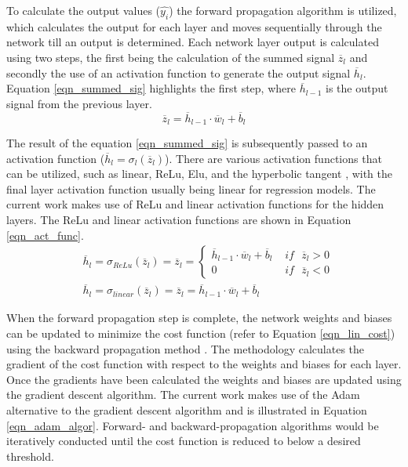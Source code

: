 \documentclass[a4paper,fleqn]{cas-dc}
\begin{document}
To calculate the output values ($\hat{y_i}$) the forward propagation algorithm is utilized, which calculates the output for each layer and moves sequentially through the network till an output is determined. Each network layer output is calculated using two steps, the first being the calculation of the summed signal $\overline{z}_l$ and secondly the use of an activation function to generate the output signal $\overline{h}_l$. Equation \ref{eqn_summed_sig} highlights the first step, where $\overline{h}_{l-1}$ is the output signal from the previous layer.
\begin{equation}\label{eqn_summed_sig}
\overline{z}_l = \overline{h}_{l-1}\cdot\overline{w}_l+\overline{b}_l
\end{equation}

The result of the equation \ref{eqn_summed_sig} is subsequently passed to an activation function ($\overline{h}_l = \sigma_l(\overline{z}_l)$). There are various activation functions that can be utilized, such as linear, ReLu, Elu, and the hyperbolic tangent \citep{goodfellow}, with the final layer activation function usually being linear for regression models. The current work makes use of ReLu and linear activation functions for the hidden layers. The ReLu and linear activation functions are shown in Equation \ref{eqn_act_func}.
\begin{equation}\label{eqn_act_func}
\begin{split}
&\overline{h}_l=\sigma_{ReLu}(\overline{z}_l) = \overline{z}_l =  
	\begin{cases}
	 \overline{h}_{l-1}\cdot\overline{w}_l+\overline{b}_l\,\, &if\,\,\,\, \overline{z}_l>0\\
	 0\,\, &if\,\,\,\, \overline{z}_l<0
	\end{cases}\\
&\overline{h}_l=\sigma_{linear}(\overline{z}_l) = \overline{z}_l = \overline{h}_{l-1}\cdot\overline{w}_l+\overline{b}_l
\end{split}
\end{equation}

When the forward propagation step is complete, the network weights and biases can be updated to minimize the cost function (refer to Equation \ref{eqn_lin_cost}) using the backward propagation method \cite{Rumelhart1986}. The methodology calculates the gradient of the cost function with respect to the weights and biases for each layer. Once the gradients have been calculated the weights and biases are updated using the gradient descent algorithm. The current work makes use of the Adam \cite{goodfellow} alternative to the gradient descent algorithm and is illustrated in Equation \ref{eqn_adam_algor}. Forward- and backward-propagation algorithms would be iteratively conducted until the cost function is reduced to below a desired threshold.
\end{document}
